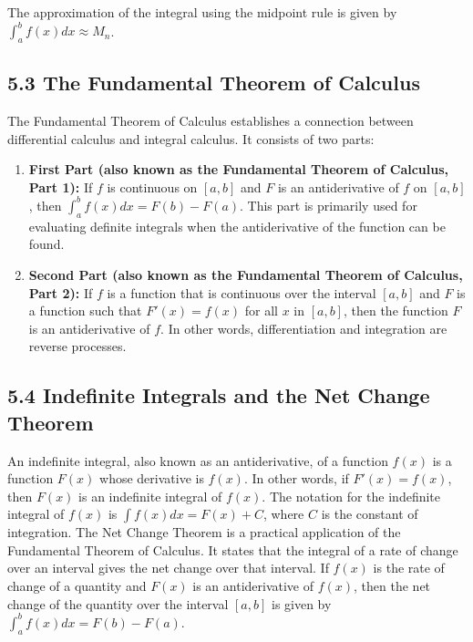\documentclass{article}
\begin{document}
The approximation of the integral using the midpoint rule is given by $\int_{a}^{b} f(x) dx \approx M_n$.

\subsection{5.3 The Fundamental Theorem of Calculus}

The Fundamental Theorem of Calculus establishes a connection between differential calculus and integral calculus. It consists of two parts:

\begin{enumerate}
\item \textbf{First Part (also known as the Fundamental Theorem of Calculus, Part 1):} If $f$ is continuous on $[a, b]$ and $F$ is an antiderivative of $f$ on $[a, b]$, then $\int_{a}^{b} f(x) dx = F(b) - F(a)$. This part is primarily used for evaluating definite integrals when the antiderivative of the function can be found.

\item \textbf{Second Part (also known as the Fundamental Theorem of Calculus, Part 2):} If $f$ is a function that is continuous over the interval $[a, b]$ and $F$ is a function such that $F'(x) = f(x)$ for all $x$ in $[a, b]$, then the function $F$ is an antiderivative of $f$. In other words, differentiation and integration are reverse processes.
\end{enumerate}

\subsection{5.4 Indefinite Integrals and the Net Change Theorem}

An indefinite integral, also known as an antiderivative, of a function $f(x)$ is a function $F(x)$ whose derivative is $f(x)$. In other words, if $F'(x) = f(x)$, then $F(x)$ is an indefinite integral of $f(x)$. The notation for the indefinite integral of $f(x)$ is $\int f(x) dx = F(x) + C$, where $C$ is the constant of integration.
The Net Change Theorem is a practical application of the Fundamental Theorem of Calculus. It states that the integral of a rate of change over an interval gives the net change over that interval. If $f(x)$ is the rate of change of a quantity and $F(x)$ is an antiderivative of $f(x)$, then the net change of the quantity over the interval $[a, b]$ is given by $\int_{a}^{b} f(x) dx = F(b) - F(a)$.
\end{document}
